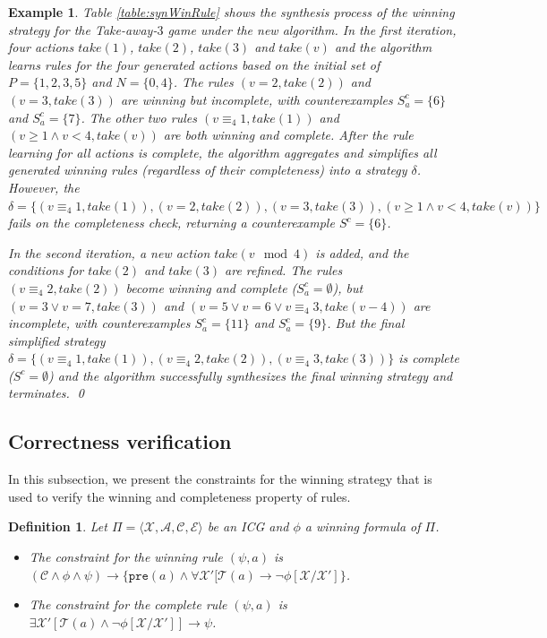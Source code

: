 \documentclass[review]{elsarticle}
\newcommand{\set}[1]{\{ #1 \}}
\newcommand{\tuple}[1]{\langle {#1} \rangle}
\newcommand{\statevar}{\mathcal{X}}
\newcommand{\act}{\mathcal{A}}
\newcommand{\trans}{\mathcal{T}}
\newcommand{\constraint}{\mathcal{C}}
\newcommand{\estate}{\mathcal{E}}
\newcommand{\pre}{\mathtt{pre}}
\newcommand{\modulo}{\equiv}
\newtheorem{definition}{Definition}
\newtheorem{example}{Example}
\begin{document}
\begin{example} \rm
    Table \ref{table:synWinRule} shows the synthesis process of the winning strategy for the Take-away-$3$ game under the new algorithm. 
	In the first iteration, four actions $take(1)$, $take(2)$, $take(3)$ and $take(v)$ and the algorithm learns rules for the four generated actions based on the initial set of $P=\{1, 2, 3,5\} $ and  $N=\{0, 4\}$.
	The rules $(v = 2, take(2))$ and $(v = 3, take(3))$ are winning but incomplete, with counterexamples $S^c_a = \{6\}$ and $S^c_a = \{7\}$. 
	The other two rules $(v \modulo_4 1, take(1))$ and $(v \geq 1 \land v < 4, take(v))$ are both winning and complete.
	After the rule learning for all actions is complete, the algorithm aggregates and simplifies all generated winning rules (regardless of their completeness) into a strategy $\delta$.	 
	However, the $\delta = \set{(v \modulo_4 1, take(1)), (v = 2, take(2)), (v = 3, take(3)), (v \geq 1 \land v < 4, take(v))}$ fails on the completeness check, returning a counterexample $S^c=\{6\}$.

    In the second iteration, a new action $take(v \mod 4)$ is added, and the conditions for $take(2)$ and $take(3)$ are refined.
	The rules $(v \modulo_4 2, take(2))$ become winning and complete ($S^c_a=\emptyset$), but $(v = 3 \vee v = 7, take(3))$ and $(v = 5 \vee v = 6 \vee v \modulo_4 3, take(v - 4))$ are incomplete, with counterexamples $S^c_a = \{11\}$ and $S^c_a = \{9\}$. 
	But the final simplified strategy $\delta = \set{(v \modulo_4 1, take(1)), (v \modulo_4 2, take(2)), (v \modulo_4 3, take(3))}$ is complete ($S^c=\emptyset$)  and the algorithm successfully synthesizes the final winning strategy and terminates. \qed
\end{example}	

\subsection{Correctness verification} \label{sec:winStrCorVer}
In this subsection, we present the constraints for the winning strategy that is used to verify the winning and completeness property of rules.

\begin{definition} \label{def:consWinRule} \rm
	Let $\Pi = \tuple{\statevar, \act, \constraint, \estate}$ be an ICG and $\phi$ a winning formula of $\Pi$.
	\begin{itemize}
		\item The constraint for the winning rule $(\psi, a)$ is $(\constraint \land \phi \land \psi) \rightarrow \{\pre(a) \land \forall \statevar' [\trans(a) \rightarrow \neg \phi[\statevar/\statevar']\}$.
		
		\item The constraint for the complete rule $(\psi, a)$ is $\exists \statevar' [\trans(a) \land \neg \phi[\statevar/\statevar']] \rightarrow \psi$.
	\end{itemize}		
\end{definition}
\end{document}
